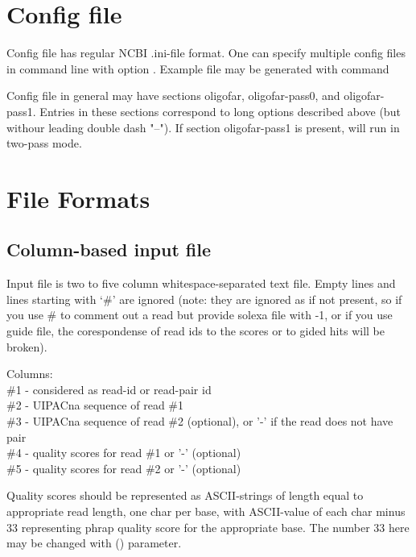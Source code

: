 \documentclass[english,letter]{article}
\begin{document}
\section{Config file}

	Config file has regular NCBI .ini-file format.  One can specify multiple 
	config files in command line with option .  Example file
	may be generated with command ~

	Config file in general may have sections \Lbr oligofar\Rbr, \Lbr oligofar-pass0\Rbr,
	and \Lbr oligofar-pass1\Rbr. Entries in these sections correspond to long options 
	described above (but withour leading double dash "--").  If section \Lbr oligofar-pass1\Rbr
	is present,  will run in two-pass mode.

\section{File Formats}\label{secFileFormats}

\subsection{Column-based input file}

    Input file is two to five column whitespace-separated text file. Empty
    lines and lines starting with `\#' are ignored (note: they are ignored as
    if not present, so if you use \# to comment out a read but provide solexa
    file with -1, or if you use guide file, the corespondense of read ids to 
    the scores or to gided hits will be broken).

    Columns:\\
	\#1 - considered as read-id or read-pair id\\
    \#2 - UIPACna sequence of read \#1\\
    \#3 - UIPACna sequence of read \#2 (optional), or '-' if the read does not have pair\\
    \#4 - quality scores for read \#1 or '-' (optional)\\
    \#5 - quality scores for read \#2 or '-' (optional)

    Quality scores should be represented as ASCII-strings of length equal to 
    appropriate read length, one char per base, with ASCII-value of each char 
    minus 33 representing phrap quality score for the appropriate base.  The 
    number 33 here may be changed with  () parameter.
\end{document}
